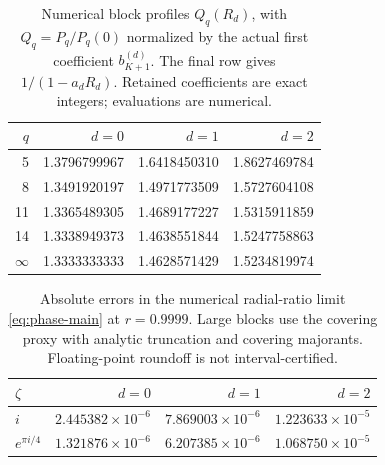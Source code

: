 \begin{table}[htbp]
\centering
\caption{Numerical block profiles $Q_q(R_d)$, with $Q_q=P_q/P_q(0)$
normalized by the actual first coefficient $b_{K+1}^{(d)}$.
The final row gives $1/(1-a_dR_d)$.
Retained coefficients are exact integers; evaluations are numerical.}
\label{tab:computed-block-profiles}
\begin{tabular}{rrrr}
\toprule
$q$ & $d=0$ & $d=1$ & $d=2$ \\
\midrule
5 & 1.3796799967 & 1.6418450310 & 1.8627469784 \\
8 & 1.3491920197 & 1.4971773509 & 1.5727604108 \\
11 & 1.3365489305 & 1.4689177227 & 1.5315911859 \\
14 & 1.3338949373 & 1.4638551844 & 1.5247758863 \\
\midrule
$\infty$ & 1.3333333333 & 1.4628571429 & 1.5234819974 \\
\bottomrule
\end{tabular}
\end{table}

\begin{table}[htbp]
\centering
\caption{Absolute errors in the numerical radial-ratio limit
\eqref{eq:phase-main} at $r=0.9999$.
Large blocks use the covering proxy with analytic truncation and covering
majorants. Floating-point roundoff is not interval-certified.}
\label{tab:computed-radial-errors}
\begin{tabular}{lrrr}
\toprule
$\zeta$ & $d=0$ & $d=1$ & $d=2$ \\
\midrule
$i$ & $2.445382\times10^{-6}$ & $7.869003\times10^{-6}$ & $1.223633\times10^{-5}$ \\
$e^{\pi i/4}$ & $1.321876\times10^{-6}$ & $6.207385\times10^{-6}$ & $1.068750\times10^{-5}$ \\
\bottomrule
\end{tabular}
\end{table}
